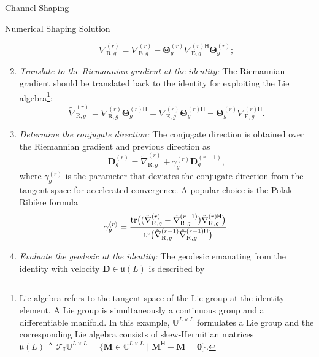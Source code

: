\documentclass[journal]{IEEEtran}
\begin{document}
\begin{section}{Channel Shaping}
\begin{subsection}{Numerical Shaping Solution}
\begin{enumerate}[label=(\roman*)]
				\begin{equation}
					\label{eq:gradient_riem}
					\nabla_{\mathrm{R},g}^{(r)} = \nabla_{\mathrm{E},g}^{(r)} - \mathbf{\Theta}_g^{(r)} {\nabla_{\mathrm{E},g}^{(r)\mathsf{H}}} \mathbf{\Theta}_g^{(r)};
				\end{equation}
			\item \emph{Translate to the Riemannian gradient at the identity:} The Riemannian gradient should be translated back to the identity for exploiting the Lie algebra\footnote{Lie algebra refers to the tangent space of the Lie group at the identity element. A Lie group is simultaneously a continuous group and a differentiable manifold. In this example, $\mathbb{U}^{L \times L}$ formulates a Lie group and the corresponding Lie algebra consists of skew-Hermitian matrices $\mathfrak{u}(L) \triangleq \mathcal{T}_{\mathbf{I}}\mathbb{U}^{L \times L} = \{\mathbf{M} \in \mathbb{C}^{L \times L} \mid \mathbf{M}^\mathsf{H} + \mathbf{M} = \mathbf{0}\}$.}:
				\begin{equation}
					\label{eq:gradient_riem_tran}
					\tilde{\nabla}_{\mathrm{R},g}^{(r)} = \nabla_{\mathrm{R},g}^{(r)} \mathbf{\Theta}_g^{(r)\mathsf{H}} = \nabla_{\mathrm{E},g}^{(r)} \mathbf{\Theta}_g^{(r)\mathsf{H}} - \mathbf{\Theta}_g^{(r)} {\nabla_{\mathrm{E},g}^{(r)\mathsf{H}}}.
				\end{equation}
			\item \emph{Determine the conjugate direction:} The conjugate direction is obtained over the Riemannian gradient and previous direction as
				\begin{equation}
					\label{eq:conjugate_dirn_geod}
					{\mathbf{D}}_g^{(r)} = \tilde{\nabla}_{\mathrm{R},g}^{(r)} + {\gamma}_g^{(r)} {\mathbf{D}}_g^{(r-1)},
				\end{equation}
				where $\gamma_g^{(r)}$ is the parameter that deviates the conjugate direction from the tangent space for accelerated convergence. A popular choice is the Polak-Ribi\`{e}re formula \cite{Hager2006}
				\begin{equation}
					\label{eq:conjugate_parm_geod}
					{\gamma}_g^{(r)} = \frac{\tr\bigl((\tilde{\nabla}_{\mathrm{R},g}^{(r)} - \tilde{\nabla}_{\mathrm{R},g}^{(r-1)}) {\tilde{\nabla}_{\mathrm{R},g}^{(r)\mathsf{H}}}\bigr)}{\tr\bigl(\tilde{\nabla}_{\mathrm{R},g}^{(r-1)} {\tilde{\nabla}_{\mathrm{R},g}^{(r-1)\mathsf{H}}}\bigr)}. %
				\end{equation}
			\item \emph{Evaluate the geodesic at the identity:} The geodesic emanating from the identity with velocity $\mathbf{D} \in \mathfrak{u}(L)$ is described by

\end{enumerate}
\end{subsection}
\end{section}
\end{document}
